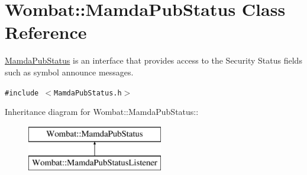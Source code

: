 \hypertarget{classWombat_1_1MamdaPubStatus}{
\section{Wombat::Mamda\-Pub\-Status Class Reference}
\label{classWombat_1_1MamdaPubStatus}
}
\hyperlink{classWombat_1_1MamdaPubStatus}{Mamda\-Pub\-Status} is an interface that provides access to the Security Status fields such as symbol announce messages.  


{\tt \#include $<$Mamda\-Pub\-Status.h$>$}

Inheritance diagram for Wombat::Mamda\-Pub\-Status::\begin{figure}[H]
\begin{center}
\leavevmode
\includegraphics[height=2cm]{classWombat_1_1MamdaPubStatus}
\end{center}
\end{figure}
